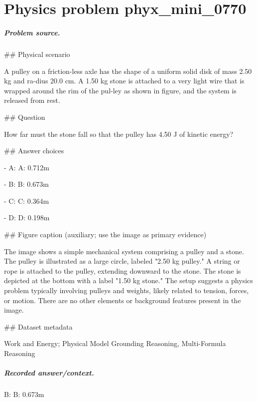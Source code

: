 
\chapter{Physics problem phyx\_mini\_0770}
\label{ch:PhyXMiniProblems_problem_phyx_mini_0770}

\paragraph{Problem source.}
\#\# Physical scenario

A pulley on a friction-less axle has the shape of a uniform solid disk of mass 2.50 kg and ra-dius 20.0 cm. A 1.50 kg stone is attached to a very light wire that is wrapped around the rim of the pul-ley as shown in figure, and the system is released from rest.

\#\# Question

How far must the stone fall so that the pulley has 4.50 J of kinetic energy?

\#\# Answer choices

- A: A: 0.712m

- B: B: 0.673m

- C: C: 0.364m

- D: D: 0.198m

\#\# Figure caption (auxiliary; use the image as primary evidence)

The image shows a simple mechanical system comprising a pulley and a stone. The pulley is illustrated as a large circle, labeled "2.50 kg pulley." A string or rope is attached to the pulley, extending downward to the stone. The stone is depicted at the bottom with a label "1.50 kg stone." The setup suggests a physics problem typically involving pulleys and weights, likely related to tension, forces, or motion. There are no other elements or background features present in the image.

\#\# Dataset metadata

Work and Energy; Physical Model Grounding Reasoning, Multi-Formula Reasoning

\paragraph{Recorded answer/context.}
B: B: 0.673m

